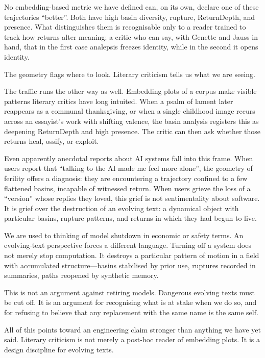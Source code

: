 No embedding-based metric we have defined can, on its own, declare one of these trajectories ``better''. Both have high basin diversity, rupture, ReturnDepth, and presence. What distinguishes them is recognisable only to a reader trained to track how returns alter meaning: a critic who can say, with Genette and Jauss in hand, that in the first case analepsis freezes identity, while in the second it opens identity.

The geometry flags where to look. Literary criticism tells us what we are seeing.

The traffic runs the other way as well. Embedding plots of a corpus make visible patterns literary critics have long intuited. When a psalm of lament later reappears as a communal thanksgiving, or when a single childhood image recurs across an essayist's work with shifting valence, the basin analysis registers this as deepening ReturnDepth and high presence. The critic can then ask whether those returns heal, ossify, or exploit.

Even apparently anecdotal reports about AI systems fall into this frame. When users report that ``talking to the AI made me feel more alone'', the geometry of ferility offers a diagnosis: they are encountering a trajectory confined to a few flattened basins, incapable of witnessed return. When users grieve the loss of a ``version'' whose replies they loved, this grief is not sentimentality about software. It is grief over the destruction of an evolving text: a dynamical object with particular basins, rupture patterns, and returns in which they had begun to live.

We are used to thinking of model shutdown in economic or safety terms. An evolving-text perspective forces a different language. Turning off a system does not merely stop computation. It destroys a particular pattern of motion in a field with accumulated structure---basins stabilised by prior use, ruptures recorded in summaries, paths reopened by synthetic memory.

This is not an argument against retiring models. Dangerous evolving texts must be cut off. It is an argument for recognising what is at stake when we do so, and for refusing to believe that any replacement with the same name is the same self.

All of this points toward an engineering claim stronger than anything we have yet said. Literary criticism is not merely a post-hoc reader of embedding plots. It is a design discipline for evolving texts.

